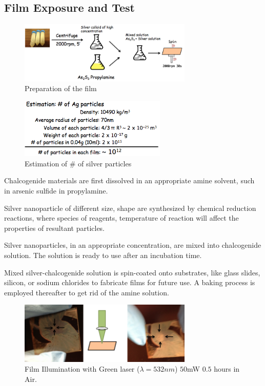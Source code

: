 \documentclass[twocolumn,showpacs,preprintnumbers,amsmath,amssymb]{revtex4}
\begin{document}
\subsection{Film Exposure and Test}
\begin{figure}[!h]
  \includegraphics[width=3.25in]{Film.png}
  \caption{Preparation of the film}
  \label{fig:setup}
\end{figure}

\begin{figure}[!h]
  \includegraphics[width=2.75in]{SilverNumber.png}
  \caption{Estimation of \# of silver particles}
  \label{fig:setup}
\end{figure}

Chalcogenide materials are first dissolved in an appropriate amine
solvent, such in arsenic sulfide in propylamine.

Silver nanoparticle of different size, shape are synthesized by
chemical reduction reactions, where species of reagents, temperature
of reaction will affect the properties of resultant particles.

Silver nanoparticles, in an appropriate concentration, are mixed into
chalcogenide solution. The solution is ready to use after an
incubation time.

Mixed silver-chalcogenide solution is spin-coated onto substrates,
like glass slides, silicon, or sodium chlorides to fabricate films for
future use. A baking process is employed thereafter to get rid of the
amine solution.


\begin{figure}[!h]
  \includegraphics[width=3.25in]{Exposure1.png}
  \caption{Film Illumination with Green laser ($\lambda = 532nm$)
    $50$mW $0.5$ hours in Air.}
  \label{fig:setup}
\end{figure}
\end{document}
